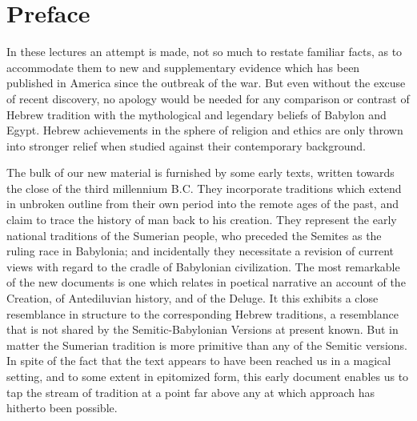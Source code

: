 \documentclass[12pt,oneside]{book}
\begin{document}
\tableofcontents

\chapter{Preface}
In these lectures an attempt is made, not so much to restate familiar facts, as to accommodate them to new and supplementary evidence which has been published in America since the outbreak of the war. But even without the excuse of recent discovery, no apology would be needed for any comparison or contrast of Hebrew tradition with the mythological and legendary beliefs of Babylon and Egypt. Hebrew achievements in the sphere of religion and ethics are only thrown into stronger relief when studied against their contemporary background. \par 

The bulk of our new material is furnished by some early texts, written towards the close of the third millennium B.C. They incorporate traditions which extend in unbroken outline from their own period into the remote ages of the past, and claim to trace the history of man back to his creation. They represent the early national traditions of the Sumerian people, who preceded the Semites as the ruling race in Babylonia; and incidentally they necessitate a revision of current views with regard to the cradle of Babylonian civilization. The most remarkable of the new documents is one which relates in poetical narrative an account of the Creation, of Antediluvian history, and of the Deluge. It this exhibits a close resemblance in structure to the corresponding Hebrew traditions, a resemblance that is not shared by the Semitic-Babylonian Versions at present known. But in matter the Sumerian tradition is more primitive than any of the Semitic versions. In spite of the fact that the text appears to have been reached us in a magical setting, and to some extent in epitomized form, this early document enables us to tap the stream of tradition at a point far above any at which approach has hitherto been possible. \par 
\end{document}
